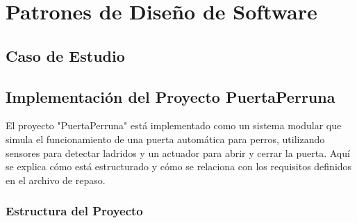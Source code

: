 
\chapter{Patrones de Diseño de Software}
\vspace{160pt}
\section{Caso de Estudio}

\section{Implementación del Proyecto PuertaPerruna}

El proyecto "PuertaPerruna" está implementado como un sistema modular que simula el funcionamiento de una puerta automática para perros, utilizando sensores para detectar ladridos y un actuador para abrir y cerrar la puerta. Aquí se explica cómo está estructurado y cómo se relaciona con los requisitos definidos en el archivo de repaso.

\subsection{Estructura del Proyecto}

